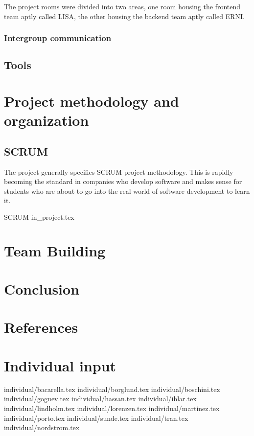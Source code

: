 \documentclass[11pt]{report}
\begin{document}
The project rooms were divided into two areas, one room housing the frontend team aptly called LISA, the other housing the backend team aptly called ERNI. 


\subsection{Intergroup communication}

\section{Tools}



\chapter{Project methodology and organization}
\section{SCRUM}

The project generally specifies SCRUM project methodology. This is rapidly becoming the standard in companies who develop software and makes sense for students who are about to go into the real world of software development to learn it.





 {SCRUM-in_project.tex}


\chapter{Team Building}

\chapter{Conclusion}


\chapter{References}

\appendix
\chapter{Individual input}

 {individual/bacarella.tex}
 {individual/borglund.tex}
 {individual/boschini.tex}
 {individual/goguev.tex}
 {individual/hassan.tex}
 {individual/ihlar.tex}
 {individual/lindholm.tex}
 {individual/lorenzen.tex}
 {individual/martinez.tex}
 {individual/porto.tex}
 {individual/sunde.tex}
 {individual/tran.tex}
 {individual/nordstrom.tex}
\end{document}
